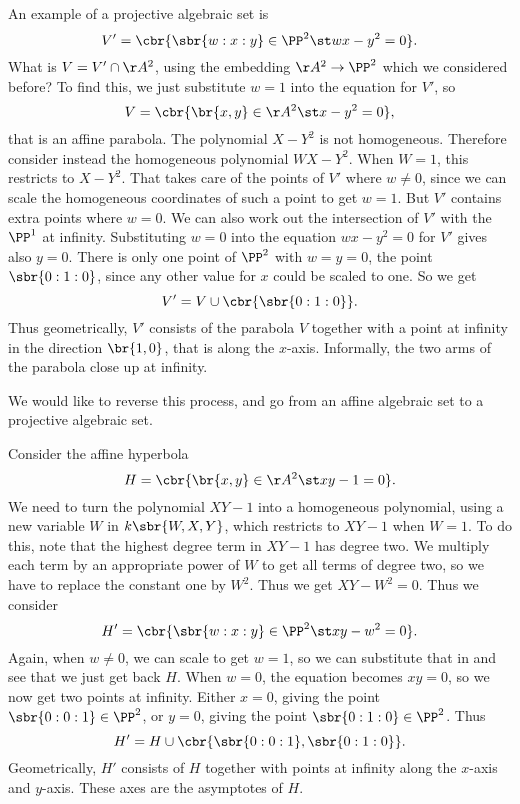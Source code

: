 \begin{example*}
An example of a projective algebraic set is
$$ V' = \cbr{\sbr{w : x : y} \in \PP^2 \st wx - y^2 = 0}. $$
What is $ V = V' \cap \AA^2 $, using the embedding $ \AA^2 \to \PP^2 $ which we considered before? To find this, we just substitute $ w = 1 $ into the equation for $ V' $, so
$$ V = \cbr{\br{x, y} \in \AA^2 \st x - y^2 = 0}, $$
that is an affine parabola. The polynomial $ X - Y^2 $ is not homogeneous. Therefore consider instead the homogeneous polynomial $ WX - Y^2 $. When $ W = 1 $, this restricts to $ X - Y^2 $. That takes care of the points of $ V' $ where $ w \ne 0 $, since we can scale the homogeneous coordinates of such a point to get $ w = 1 $. But $ V' $ contains extra points where $ w = 0 $. We can also work out the intersection of $ V' $ with the $ \PP^1 $ at infinity. Substituting $ w = 0 $ into the equation $ wx - y^2 = 0 $ for $ V' $ gives also $ y = 0 $. There is only one point of $ \PP^2 $ with $ w = y = 0 $, the point $ \sbr{0 : 1 : 0} $, since any other value for $ x $ could be scaled to one. So we get
$$ V' = V \cup \cbr{\sbr{0 : 1 : 0}}. $$
Thus geometrically, $ V' $ consists of the parabola $ V $ together with a point at infinity in the direction $ \br{1, 0} $, that is along the $ x $-axis. Informally, the two arms of the parabola close up at infinity.
\end{example*}

We would like to reverse this process, and go from an affine algebraic set to a projective algebraic set.

\begin{example*}
Consider the affine hyperbola
$$ H = \cbr{\br{x, y} \in \AA^2 \st xy - 1 = 0}. $$
We need to turn the polynomial $ XY - 1 $ into a homogeneous polynomial, using a new variable $ W $ in $ k\sbr{W, X, Y} $, which restricts to $ XY - 1 $ when $ W = 1 $. To do this, note that the highest degree term in $ XY - 1 $ has degree two. We multiply each term by an appropriate power of $ W $ to get all terms of degree two, so we have to replace the constant one by $ W^2 $. Thus we get $ XY - W^2 = 0 $. Thus we consider
$$ H' = \cbr{\sbr{w : x : y} \in \PP^2 \st xy - w^2 = 0}. $$
Again, when $ w \ne 0 $, we can scale to get $ w = 1 $, so we can substitute that in and see that we just get back $ H $. When $ w = 0 $, the equation becomes $ xy = 0 $, so we now get two points at infinity. Either $ x = 0 $, giving the point $ \sbr{0 : 0 : 1} \in \PP^2 $, or $ y = 0 $, giving the point $ \sbr{0 : 1 : 0} \in \PP^2 $. Thus
$$ H' = H \cup \cbr{\sbr{0 : 0 : 1}, \sbr{0 : 1 : 0}}. $$
Geometrically, $ H' $ consists of $ H $ together with points at infinity along the $ x $-axis and $ y $-axis. These axes are the asymptotes of $ H $.
\end{example*}

